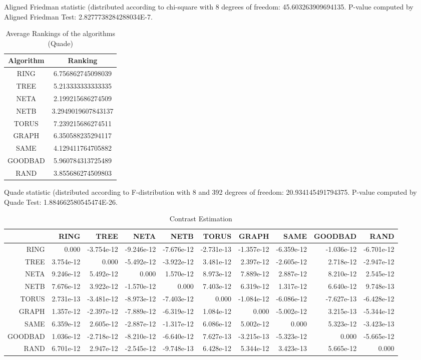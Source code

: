 \documentclass[a4paper,10pt]{article}
\begin{document}
\begin{landscape}
Aligned Friedman statistic (distributed according to chi-square with 8 degrees of freedom: 45.603263909694135. 
P-value computed by Aligned Friedman Test: 2.8277738284288034E-7.\newline


\newpage

\begin{table}[!htp]
\centering
\caption{Average Rankings of the algorithms (Quade)
}\begin{tabular}{c|c}
Algorithm&Ranking\\
\hline
 RING&6.756862745098039\\
 TREE&5.213333333333335\\
 NETA&2.199215686274509\\
 NETB&3.2949019607843137\\
 TORUS&7.239215686274511\\
 GRAPH&6.350588235294117\\
 SAME&4.129411764705882\\
 GOODBAD&5.960784313725489\\
 RAND&3.855686274509803\\
\end{tabular}
\end{table}
Quade statistic (distributed according to F-distribution with 8 and 392 degrees of freedom: 20.934145491794375. 
P-value computed by Quade Test: 1.884662580545474E-26.\newline


\newpage

\begin{table}[!htp]
\centering\tiny
\caption{Contrast Estimation}
\begin{tabular}{
|r|r|r|r|r|r|r|r|r|r|}
\hline
 & RING& TREE& NETA& NETB& TORUS& GRAPH& SAME& GOODBAD& RAND\\
\hline
 RING&0.000&-3.754e-12&-9.246e-12&-7.676e-12&-2.731e-13&-1.357e-12&-6.359e-12&-1.036e-12&-6.701e-12\\
\hline
 TREE&3.754e-12&0.000&-5.492e-12&-3.922e-12&3.481e-12&2.397e-12&-2.605e-12&2.718e-12&-2.947e-12\\
\hline
 NETA&9.246e-12&5.492e-12&0.000&1.570e-12&8.973e-12&7.889e-12&2.887e-12&8.210e-12&2.545e-12\\
\hline
 NETB&7.676e-12&3.922e-12&-1.570e-12&0.000&7.403e-12&6.319e-12&1.317e-12&6.640e-12&9.748e-13\\
\hline
 TORUS&2.731e-13&-3.481e-12&-8.973e-12&-7.403e-12&0.000&-1.084e-12&-6.086e-12&-7.627e-13&-6.428e-12\\
\hline
 GRAPH&1.357e-12&-2.397e-12&-7.889e-12&-6.319e-12&1.084e-12&0.000&-5.002e-12&3.215e-13&-5.344e-12\\
\hline
 SAME&6.359e-12&2.605e-12&-2.887e-12&-1.317e-12&6.086e-12&5.002e-12&0.000&5.323e-12&-3.423e-13\\
\hline
 GOODBAD&1.036e-12&-2.718e-12&-8.210e-12&-6.640e-12&7.627e-13&-3.215e-13&-5.323e-12&0.000&-5.665e-12\\
\hline
 RAND&6.701e-12&2.947e-12&-2.545e-12&-9.748e-13&6.428e-12&5.344e-12&3.423e-13&5.665e-12&0.000\\
\hline


\end{tabular}
\end{table}
\end{landscape}
\end{document}
